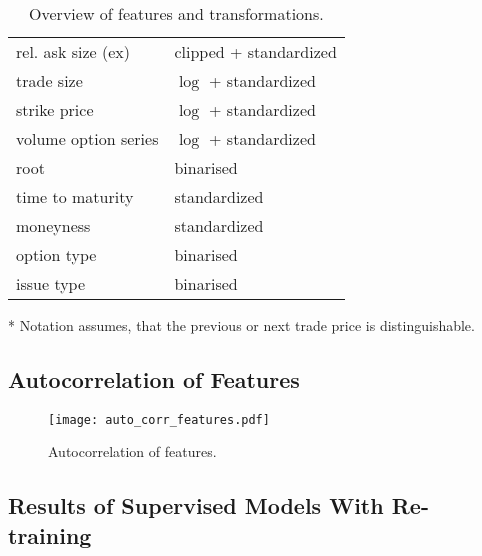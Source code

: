 \begin{table}[H]
\begin{threeparttable}
\begin{tabular}{@{}ll@{}}
            rel. ask size (ex)      & clipped + standardized \\
            trade size              & $\log$ + standardized  \\ \addlinespace
            strike price            & $\log$ + standardized  \\
            volume option series    & $\log$ + standardized  \\ 
            root                    & binarised              \\ 
            time to maturity        & standardized           \\
            moneyness               & standardized           \\
            option type             & binarised              \\
            issue type              & binarised              \\ \bottomrule
        \end{tabular}
        \begin{tablenotes}\footnotesize
            \item[*] Notation assumes, that the previous or next trade price is distinguishable.
        \end{tablenotes}
    \end{threeparttable}
    \caption[Overview of Features and Transformations]{Overview of features and transformations.}
    \label{tab:features-transformations}
\end{table}

\newpage
\subsection{Autocorrelation of Features}
\label{app:autocorrelation-of-features}

\begin{figure}[ht]
    \centering
    \texttt{[image: auto\_corr\_features.pdf]}
    \caption[Autocorrelation of Features]{Autocorrelation of features.}
    \label{fig:auto-correlation-features}
\end{figure}

\newpage
\subsection{Results of Supervised Models With Re-training}
\label{app:results-of-supervised-models-with-re-training}

